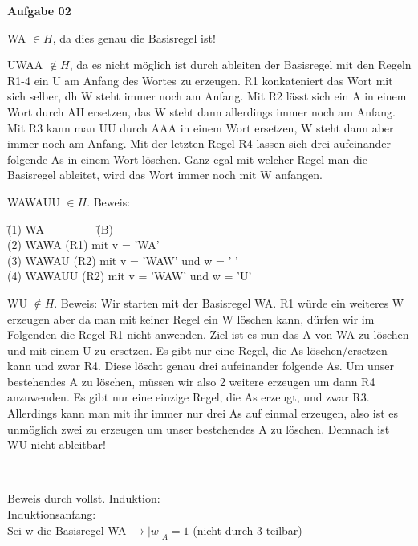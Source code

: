 \documentclass[a4paper,10pt]{article}
\begin{document}
	\textbf{Aufgabe 02}
	\begin{compactenum} [(a)]
		\item \begin{compactenum} [(i)]
			\item WA $ \in H $, da dies genau die Basisregel ist!
			\item UWAA $ \not\in H$, da es nicht möglich ist durch ableiten der Basisregel mit den Regeln R1-4 ein U am Anfang des Wortes zu erzeugen. R1 konkateniert das Wort mit sich selber, dh W steht immer noch am Anfang. Mit R2 lässt sich ein A in einem Wort durch AH ersetzen, das W steht dann allerdings immer noch am Anfang. Mit R3 kann man UU durch AAA in einem Wort ersetzen, W steht dann aber immer noch am Anfang. Mit der letzten Regel R4 lassen sich drei aufeinander folgende As in einem Wort löschen. Ganz egal mit welcher Regel man die Basisregel ableitet, wird das Wort immer noch mit W anfangen. 
			\item WAWAUU $ \in H $. Beweis:
			\begin{tabbing}
				\=(1) WA $ \qquad \qquad $ \= (B)\\
				\>(2) WAWA \> (R1) mit v = 'WA'\\
				\>(3) WAWAU \> (R2) mit v = 'WAW' und w = ' '\\
				\>(4) WAWAUU \> (R2) mit v = 'WAW' und w = 'U'
			\end{tabbing}
			\item WU $ \not\in H$. Beweis: Wir starten mit der Basisregel WA. R1 würde ein weiteres W erzeugen aber da man mit keiner Regel ein W löschen kann, dürfen wir im Folgenden die Regel R1 nicht anwenden. Ziel ist es nun das A von WA zu löschen und mit einem U zu ersetzen. Es gibt nur eine Regel, die As löschen/ersetzen kann und zwar R4. Diese löscht genau drei aufeinander folgende As. Um unser bestehendes A zu löschen, müssen wir also 2 weitere erzeugen um dann R4 anzuwenden. Es gibt nur eine einzige Regel, die As erzeugt, und zwar R3. Allerdings kann man mit ihr immer nur drei As auf einmal erzeugen, also ist es unmöglich zwei zu erzeugen um unser bestehendes A zu löschen. Demnach ist WU nicht ableitbar!
		\end{compactenum}\
		
		\item Beweis durch vollst. Induktion:\\
		
		\underline{Induktionsanfang:} \\
		Sei w die Basisregel WA $ \rightarrow |w|_A = 1 $ (nicht durch 3 teilbar)\\
		

\end{compactenum}
\end{document}
